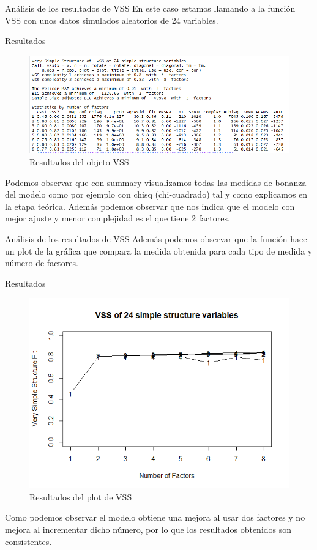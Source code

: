 \documentclass[10pt]{beamer}
\begin{document}
\begin{frame}[fragile]{Análisis de los resultados de VSS}
En este caso estamos llamando a la función VSS con unos datos simulados aleatorios de 24 variables.
\begin{alertblock}{Resultados}
	\begin{figure}
		\includegraphics[scale=0.27]{./Imagenes/res_vss1.png}
		\caption{Resultados del objeto VSS}
	\end{figure}
	Podemos observar que con summary visualizamos todas las medidas de bonanza del modelo como por ejemplo con chisq (chi-cuadrado) tal y como explicamos en la etapa teórica. Además podemos observar que nos indica que el modelo con mejor ajuste y menor complejidad es el que tiene 2 factores.
\end{alertblock}
\end{frame}
\begin{frame}[fragile]{Análisis de los resultados de VSS}
Además podemos observar que la función hace un plot de la gráfica que compara la medida obtenida para cada tipo de medida y número de factores.
\begin{alertblock}{Resultados}
	\begin{figure}
		\includegraphics[scale=0.25]{./Imagenes/res_vss2.png}
		\caption{Resultados del plot de VSS}
	\end{figure}
	Como podemos observar el modelo obtiene una mejora al usar dos factores y no mejora al incrementar dicho número, por lo que los resultados obtenidos son consistentes.
\end{alertblock}
\end{frame}
\end{document}
